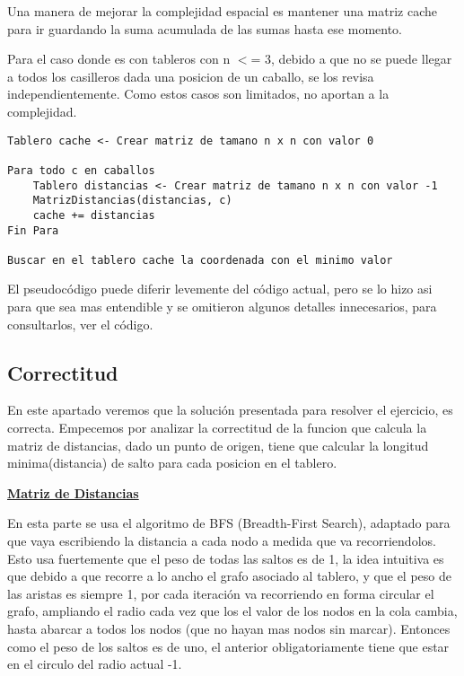 Una manera de mejorar la complejidad espacial es mantener una matriz cache para ir guardando la suma acumulada de las sumas hasta ese momento.

Para el caso donde es con tableros con n $<$= 3, debido a que no se puede llegar a todos los casilleros dada una posicion de un caballo, se los revisa independientemente. Como estos casos son limitados, no aportan a la complejidad.
\bigskip

\begin{lstlisting}
Tablero cache <- Crear matriz de tamano n x n con valor 0

Para todo c en caballos
	Tablero distancias <- Crear matriz de tamano n x n con valor -1
	MatrizDistancias(distancias, c)
	cache += distancias
Fin Para
	
Buscar en el tablero cache la coordenada con el minimo valor
\end{lstlisting}

\bigskip
El pseudocódigo puede diferir levemente del código actual, pero se lo hizo asi para que sea mas entendible y se omitieron algunos detalles innecesarios, para consultarlos, ver el código.

\newpage

\subsection{Correctitud}
En este apartado veremos que la solución presentada para resolver el ejercicio, es correcta. Empecemos por analizar la correctitud de la funcion que calcula la matriz de distancias, dado un punto de origen, tiene que calcular la longitud minima(distancia) de salto para cada posicion en el tablero.

\bigskip
\noindent \underline{\textbf{Matriz de Distancias}}

En esta parte se usa el algoritmo de BFS (Breadth-First Search), adaptado para que vaya escribiendo la distancia a cada nodo a medida que va recorriendolos. Esto usa fuertemente que el peso de todas las saltos es de 1, la idea intuitiva es que debido a que recorre a lo ancho el grafo asociado al tablero, y que el peso de las aristas es siempre 1, por cada iteración va recorriendo en forma circular el grafo, ampliando el radio cada vez que los el valor de los nodos en la cola cambia, hasta abarcar a todos los nodos (que no hayan mas nodos sin marcar). Entonces como el peso de los saltos es de uno, el anterior obligatoriamente tiene que estar en el circulo del radio actual -1.

